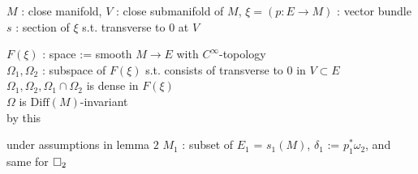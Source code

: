 \documentclass[dvipdfmx]{jsarticle}
\begin{document}
\begin{Theorem}
\itemwhen
  \For \(M\) : close manifold, \(V\) : close submanifold of \(M\), \(\xi = (p : E \to M)\) : vector bundle \\
\itemprop
  \Then \(s\) : section of \(\xi\) s.t. transverse to \(0\) at \(V\)
\end{Theorem}

\begin{Proof}
\itemwhen
  \Let \(F(\xi)\) : space := smooth \(M \to E\) with \(C^\infty\)-topology \\
  \For \(\Omega_1, \Omega_2\) : subspace of \(F(\xi)\) s.t. consists of transverse to \(0\) in \(V \subset E\) \\
  \Then \(\Omega_1, \Omega_2, \Omega_1 \cap \Omega_2\) is dense in \(F(\xi)\) \\
  \Then \(\Omega\) is \(\text{Diff}(M)\)-invariant \\
  by this
\end{Proof}

\begin{Theorem}
\itemwhen
  \For under assumptions in lemma \(2\) 
  \Let \(M_1\) : subset of \(E_1\) = \(s_1(M)\), \(\delta_1\) := \(p_1^* \omega_2\), and same for \(\square_2 \)

\end{Theorem}
\end{document}
